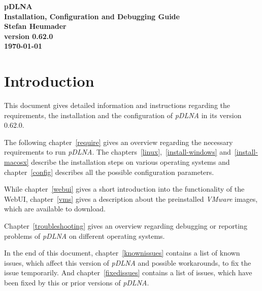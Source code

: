 \documentclass[a4paper,oneside,10pt]{report}
\newcommand{\pDLNAversion}{0.62.0}
\begin{document}
\pagestyle{empty}

\thispagestyle{empty}
\begin{center}
\Huge{\textbf{pDLNA}}\\
\vspace{0.5cm}
\Large{\textbf{Installation, Configuration and Debugging Guide}}\\
\vspace{2cm}
\large{\textbf{Stefan Heumader}}\\
\vspace{1cm}
\large{\textbf{version \pDLNAversion}}\\
\vspace{0.5cm}
\large{\textbf{\today}}\\
\end{center}

\tableofcontents
\cleardoublepage

\pagestyle{headings}

%
%

\chapter{Introduction}

This document gives detailed information and instructions regarding the requirements, the installation and the configuration of {\em pDLNA} in its version \pDLNAversion.

The following chapter~\ref{require} gives an overview regarding the necessary requirements to run {\em pDLNA}. The chapters~\ref{linux},~\ref{install-windows} and~\ref{install-macosx} describe the installation steps on various operating systems and chapter~\ref{config} describes all the possible configuration parameters.

While chapter~\ref{webui} gives a short introduction into the functionality of the WebUI, chapter~\ref{vms} gives a description about the preinstalled {\em VMware} images, which are available to download.

Chapter~\ref{troubleshooting} gives an overview regarding debugging or reporting problems of {\em pDLNA} on different operating systems.

In the end of this document, chapter~\ref{knownissues} contains a list of known issues, which affect this version of {\em pDLNA} and possible workarounds, to fix the issue temporarily. And chapter~\ref{fixedissues} contains a list of issues, which have been fixed by this or prior versions of {\em pDLNA}.
\end{document}
